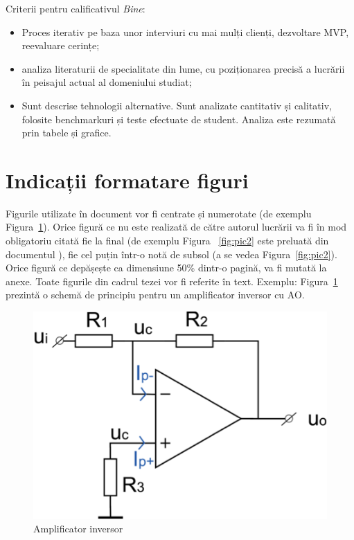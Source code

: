 \documentclass[12pt,a4paper]{report}
\newcommand{\worktype}[1]{[\textit{#1}] }
\newcommand{\dezvoltare}{\worktype{Dezvoltare de produs}}
\newcommand{\cercetare}{\worktype{Cercetare}}
\newcommand{\ambele}{\worktype{Ambele}}
\begin{document}
Criterii pentru calificativul \textit{Bine}:
\begin{itemize}
	\item \dezvoltare Proces iterativ pe baza unor interviuri cu mai mulți clienți, dezvoltare MVP, reevaluare cerințe;
	\item \cercetare analiza literaturii de specialitate din lume, cu poziționarea precisă a lucrării în peisajul actual al domeniului studiat; 
	\item \ambele Sunt descrise tehnologii alternative. Sunt analizate cantitativ și calitativ, folosite benchmarkuri și teste efectuate de student. Analiza este rezumată prin tabele și grafice.
\end{itemize}

\section{Indicații formatare figuri}

Figurile utilizate în document vor fi centrate și numerotate (de exemplu Figura~\ref{fig:pic1}). 
Orice figură ce nu este realizată de către autorul lucrării va fi în mod obligatoriu citată fie la final (de exemplu Figura ~\ref{fig:pic2} este preluată din documentul \cite{}), fie cel puțin într-o notă de subsol (a se vedea Figura~\ref{fig:pic2}). Orice figură ce depășește ca dimensiune 50\% dintr-o pagină, va fi mutată la anexe. Toate figurile din cadrul tezei vor fi referite în text. Exemplu: Figura~\ref{fig:pic1} prezintă o schemă de principiu pentru un amplificator inversor cu AO. 

\begin{figure}[th]
\centering
\includegraphics{pics/Pic1.png}
  \caption{Amplificator inversor}
  \label{fig:pic1}
\end{figure}
\end{document}
